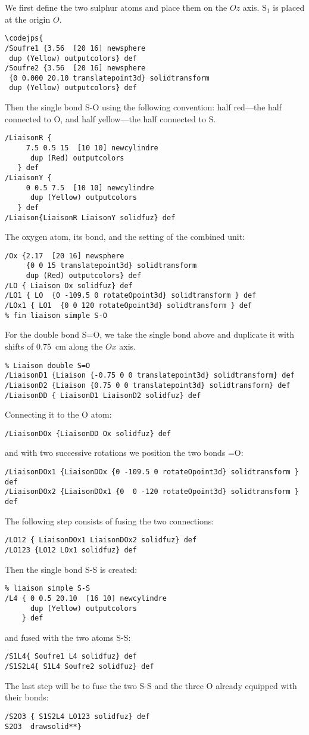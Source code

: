 We first define the two sulphur atoms and place them on the $Oz$
axis. $\mathrm{S_1}$ is placed at the origin $O$.
\begin{verbatim}
\codejps{
/Soufre1 {3.56  [20 16] newsphere
 dup (Yellow) outputcolors} def
/Soufre2 {3.56  [20 16] newsphere
 {0 0.000 20.10 translatepoint3d} solidtransform
 dup (Yellow) outputcolors} def
\end{verbatim}
Then the single bond \textsf{S-O} using the following convention:
half red---the half connected to \textsf{O}, and half yellow---the half connected to \textsf{S}.
\begin{verbatim}
/LiaisonR {
     7.5 0.5 15  [10 10] newcylindre
      dup (Red) outputcolors
   } def
/LiaisonY {
     0 0.5 7.5  [10 10] newcylindre
      dup (Yellow) outputcolors
   } def
/Liaison{LiaisonR LiaisonY solidfuz} def
\end{verbatim}
The oxygen atom, its bond, and the setting of the combined unit:
\begin{verbatim}
/Ox {2.17  [20 16] newsphere
     {0 0 15 translatepoint3d} solidtransform
     dup (Red) outputcolors} def
/LO { Liaison Ox solidfuz} def
/LO1 { LO  {0 -109.5 0 rotateOpoint3d} solidtransform } def
/LOx1 { LO1  {0 0 120 rotateOpoint3d} solidtransform } def
% fin liaison simple S-O
\end{verbatim}
For the double bond \textsf{S=O}, we take the single bond above
and duplicate it with shifts of 0.75~cm along the $Ox$ axis.
\begin{verbatim}
% Liaison double S=O
/LiaisonD1 {Liaison {-0.75 0 0 translatepoint3d} solidtransform} def
/LiaisonD2 {Liaison {0.75 0 0 translatepoint3d} solidtransform} def
/LiaisonDD { LiaisonD1 LiaisonD2 solidfuz} def
\end{verbatim}
Connecting it to the \textsf{O} atom:
\begin{verbatim}
/LiaisonDOx {LiaisonDD Ox solidfuz} def
\end{verbatim}
and with two successive rotations we position the two bonds
\textsf{=O}:
\begin{verbatim}
/LiaisonDOx1 {LiaisonDOx {0 -109.5 0 rotateOpoint3d} solidtransform } def
/LiaisonDOx2 {LiaisonDOx1 {0  0 -120 rotateOpoint3d} solidtransform } def
\end{verbatim}
The following step consists of fusing the two connections:
\begin{verbatim}
/LO12 { LiaisonDOx1 LiaisonDOx2 solidfuz} def
/LO123 {LO12 LOx1 solidfuz} def
\end{verbatim}
Then the single bond \textsf{S-S} is created:
\begin{verbatim}
% liaison simple S-S
/L4 { 0 0.5 20.10  [16 10] newcylindre
      dup (Yellow) outputcolors
    } def
\end{verbatim}
and fused with the two atoms \textsf{S-S}:
\begin{verbatim}
/S1L4{ Soufre1 L4 solidfuz} def
/S1S2L4{ S1L4 Soufre2 solidfuz} def
\end{verbatim}
The last step will be to fuse the two \textsf{S-S} and the three
\textsf{O} already equipped with their bonds:
\begin{verbatim}
/S2O3 { S1S2L4 LO123 solidfuz} def
S2O3  drawsolid**}
\end{verbatim}

\endinput
